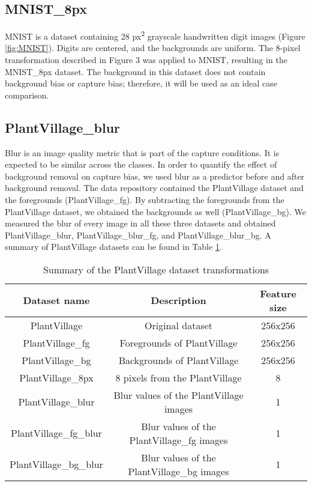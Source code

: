 \documentclass{article}
\begin{document}
\subsection{MNIST\_8px}

MNIST is a dataset containing 28 px\textsuperscript{2} grayscale handwritten digit images (Figure \ref{fig:MNIST}). Digits are centered, and the backgrounds are uniform. The 8-pixel transformation described in Figure 3 was applied to MNIST, resulting in the MNIST\_8px dataset. The background in this dataset does not contain background bias or capture bias; therefore, it will be used as an ideal case comparison.

\subsection{PlantVillage\_blur}

Blur is an image quality metric that is part of the capture conditions. It is expected to be similar across the classes. In order to quantify the effect of background removal on capture bias, we used blur as a predictor before and after background removal. The data repository contained the PlantVillage dataset and the foregrounds (PlantVillage\_fg). By subtracting the foregrounds from the PlantVillage dataset, we obtained the backgrounds as well (PlantVillage\_bg). We measured the blur of every image in all these three datasets and obtained PlantVillage\_blur, PlantVillage\_blur\_fg, and PlantVillage\_blur\_bg. A summary of PlantVillage datasets can be found in Table \ref{table:datasetsummary}.

\begin{table}[h]
\centering
\begin{tabular}{c|c|c}
Dataset name & Description & Feature size\\\hline
PlantVillage & Original dataset & 256x256\\
PlantVillage\_fg & Foregrounds of PlantVillage & 256x256\\
PlantVillage\_bg & Backgrounds of PlantVillage & 256x256\\
PlantVillage\_8px & 8 pixels from the PlantVillage & 8\\
PlantVillage\_blur & Blur values of the PlantVillage images  & 1\\
PlantVillage\_fg\_blur & Blur values of the PlantVillage\_fg images & 1\\
PlantVillage\_bg\_blur & Blur values of the PlantVillage\_bg images & 1\\

\end{tabular}
\caption{Summary of the PlantVillage dataset transformations}
\label{table:datasetsummary}
\end{table}
\end{document}
